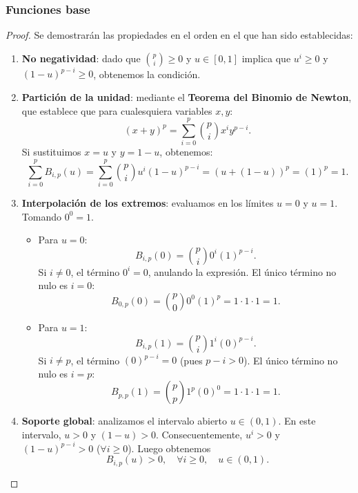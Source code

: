 \documentclass[11pt]{book}
\theoremstyle{plain} %
\theoremstyle{definition} %
\theoremstyle{definition} %
\begin{document}
\subsubsection{Funciones base}
\begin{proof}Se demostrarán las propiedades en el orden en el que han sido establecidas:
    \begin{enumerate}
        \item \textbf{No negatividad}: dado que $\binom{p}{i}\geq 0$ y $u \in [0,1]$ implica que $u^i \geq 0$ y $(1-u)^{p-i}\geq 0$, obtenemos la condición.
        \item \textbf{Partición de la unidad}: mediante el \textbf{Teorema del Binomio de Newton}, que establece que para cualesquiera variables $x, y$:
                                                $$(x+y)^p = \sum_{i=0}^{p} \binom{p}{i} x^i y^{p-i}.$$
                                                Si sustituimos $x = u$ y $y = 1-u$, obtenemos:
                                                $$\sum_{i=0}^{p} B_{i,p}(u) = \sum_{i=0}^{p} \binom{p}{i} u^i (1-u)^{p-i} = (u + (1-u))^p = (1)^p = 1.$$
        \item \textbf{Interpolación de los extremos}: evaluamos en los límites $u=0$ y $u=1$. Tomando $0^0 = 1$.
            \begin{itemize}
                \item Para $u=0$:
                $$B_{i,p}(0) = \binom{p}{i} 0^i (1)^{p-i}.$$
                Si $i \neq 0$, el término $0^i = 0$, anulando la expresión. El único término no nulo es $i=0$:
                $$B_{0,p}(0) = \binom{p}{0} 0^0 (1)^{p} = 1 \cdot 1 \cdot 1 = 1.$$
                
                \item Para $u=1$:
                $$B_{i,p}(1) = \binom{p}{i} 1^i (0)^{p-i}.$$
                Si $i \neq p$, el término $(0)^{p-i} = 0$ (pues $p-i > 0$). El único término no nulo es $i=p$:
                $$B_{p,p}(1) = \binom{p}{p} 1^p (0)^{0} = 1 \cdot 1 \cdot 1 = 1.$$
            \end{itemize}
        \item \textbf{Soporte global}: analizamos el intervalo abierto $u \in (0,1)$.
            En este intervalo, $u > 0$ y $(1-u) > 0$. Consecuentemente, $u^i > 0$ y $(1-u)^{p-i} > 0$ ($\forall i \geq 0$).
            Luego obtenemos
            $$B_{i,p}(u) > 0,\quad \forall i \geq 0, \quad u \in (0,1).$$
    \end{enumerate}
\end{proof}
\end{document}
